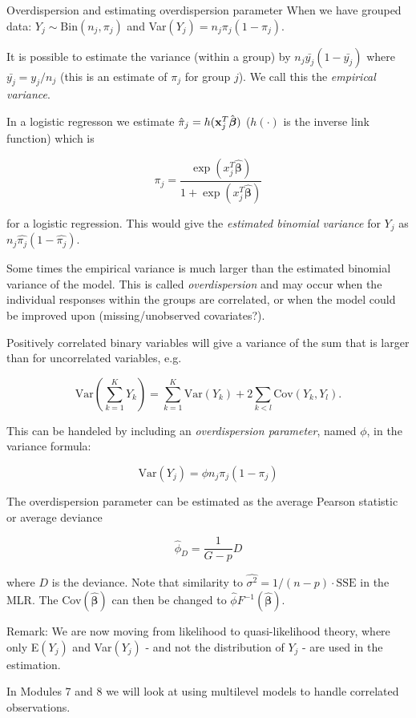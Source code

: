 \documentclass[
  ignorenonframetext,
]{beamer}
\begin{document}
\begin{frame}{Overdispersion and estimating overdispersion parameter}
\label{overdispersion-and-estimating-overdispersion-parameter}
When we have grouped data: \(Y_j \sim \text{Bin} (n_j, \pi_j)\) and
Var\((Y_j) = n_j\pi_j(1-\pi_j)\).

It is possible to estimate the variance (within a group) by
\(n_j\bar{y_j}(1-\bar{y_j})\) where \(\bar{y_j} = y_j/n_j\) (this is an
estimate of \(\pi_j\) for group \(j\)). We call this the \emph{empirical
variance}.

In a logistic regresson we estimate
\(\hat{\pi}_j = h({\bf x}_j^T\hat{\boldsymbol{\beta}})\) (\(h(\cdot)\)
is the inverse link function) which is

\[\hat{\pi_j} = \frac{\exp(x_j^T \hat{\boldsymbol{\beta}})}{1+\exp(x_j^T \hat{\boldsymbol{\beta}})} \]

for a logistic regression. This would give the \emph{estimated binomial
variance} for \(Y_j\) as \(n_j\hat{\pi_j}(1-\hat{\pi_j})\).
\end{frame}

\begin{frame}
Some times the empirical variance is much larger than the estimated
binomial variance of the model. This is called \emph{overdispersion} and
may occur when the individual responses within the groups are
correlated, or when the model could be improved upon (missing/unobserved
covariates?).

Positively correlated binary variables will give a variance of the sum
that is larger than for uncorrelated variables, e.g.

\[\text{Var}(\sum_{k=1}^K Y_k) = \sum_{k=1}^K\text{Var}(Y_k) + 2\sum_{k<l} \text{Cov}(Y_k, Y_l).\]
\end{frame}

\begin{frame}
This can be handeled by including an \emph{overdispersion parameter},
named \(\phi\), in the variance formula:

\[ \text{Var}(Y_j) = \phi n_j \pi_j (1-\pi_j)\]
\end{frame}

\begin{frame}
The overdispersion parameter can be estimated as the average Pearson
statistic or average deviance

\[\hat{\phi}_D = \frac{1}{G-p} D\]

where \(D\) is the deviance. Note that similarity to
\(\hat{\sigma^2} = 1/(n-p)\cdot\text{SSE}\) in the MLR. The
Cov\((\hat{\boldsymbol{\beta}})\) can then be changed to
\(\hat{\phi}F^{-1}(\hat{\boldsymbol{\beta}})\).

Remark: We are now moving from likelihood to quasi-likelihood theory,
where only E\((Y_j)\) and Var\((Y_j)\) - and not the distribution of
\(Y_j\) - are used in the estimation.

In Modules 7 and 8 we will look at using multilevel models to handle
correlated observations.
\end{frame}
\end{document}
